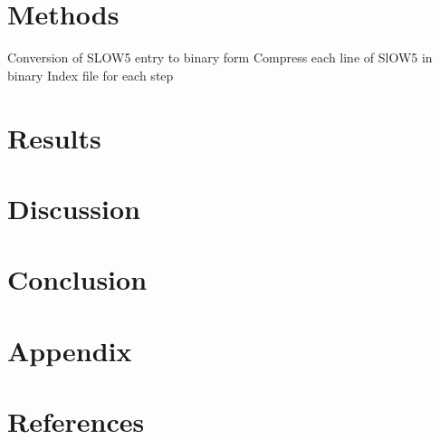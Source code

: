 \documentclass[a4paper, 12pt]{article}
\begin{document}
\section{Methods}

Conversion of SLOW5 entry to binary form
Compress each line of SlOW5 in binary
Index file for each step

\section{Results}

\section{Discussion}

\section{Conclusion}

\section{Appendix}

\section{References}
\end{document}
